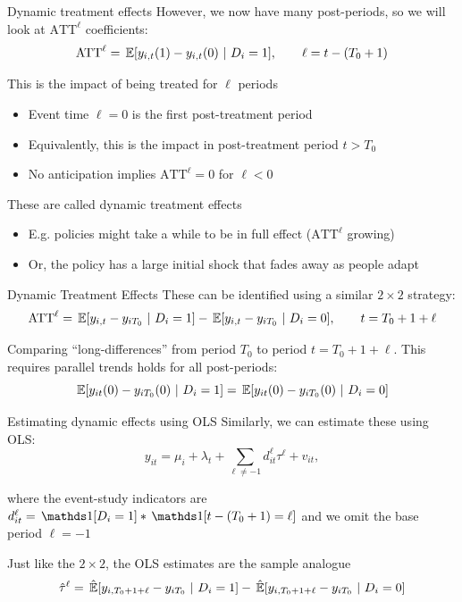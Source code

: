 \documentclass[aspectratio=169,t,11pt,table]{beamer}
\begin{document}
\begin{frame}{Dynamic treatment effects}
  However, we now have many post-periods, so we will look at $\text{ATT}^\ell$ coefficients:
  $$
    \text{ATT}^\ell = \expec{ y_{i,t}(1) - y_{i,t}(0) }{D_i = 1}, \qquad \ell = t - (T_0 + 1)
  $$  

  This is the impact of being treated for $\ell$ periods
  \begin{itemize}
    \item Event time $\ell = 0$ is the first post-treatment period
    \item Equivalently, this is the impact in post-treatment period $t > T_0$
    \item No anticipation implies $\text{ATT}^\ell = 0$ for $\ell < 0$
  \end{itemize}

  \pause
  \bigskip
  These are called \alert{dynamic treatment effects}
  \begin{itemize}
    \item E.g. policies might take a while to be in full effect ($\text{ATT}^\ell$ growing)
    
    \item Or, the policy has a large initial shock that fades away as people adapt
  \end{itemize}
\end{frame}

\begin{frame}{Dynamic Treatment Effects}
  These can be identified using a similar $2 \times 2$ strategy:
  $$
    \text{ATT}^\ell = \expec{y_{i,t} - y_{iT_0}}{D_i = 1} - \expec{y_{i,t} - y_{iT_0}}{D_i = 0},
    \qquad t = T_0 + 1 + \ell
  $$

  \bigskip
  Comparing ``long-differences'' from period $T_0$ to period $t = T_0 + 1 + \ell$. This requires parallel trends holds for all post-periods:
  $$
    \expec{y_{it}(0) - y_{iT_0}(0)}{D_i = 1} = \expec{y_{it}(0) - y_{iT_0}(0)}{D_i = 0}
  $$
\end{frame}

\begin{frame}{Estimating dynamic effects using OLS}
  Similarly, we can estimate these using OLS:
  $$
    y_{it} = \mu_i + \lambda_t + \sum_{\ell \neq -1} d_{it}^\ell \tau^\ell + v_{it},
  $$
  
  where the \alert{event-study indicators} are $d_{it}^\ell = \one{D_i = 1} * \one{t - (T_0 + 1) = \ell}$ and we omit the base period $\ell = -1$

  \bigskip
  Just like the $2 \times 2$, the OLS estimates are the sample analogue 
  $$
    \hat{\tau}^{\ell} = \expechat{y_{i,T_0 + 1 + \ell} - y_{iT_0}}{D_i = 1} - \expechat{y_{i,T_0 + 1 + \ell} - y_{iT_0}}{D_i = 0}
  $$ 
\end{frame}
\end{document}
